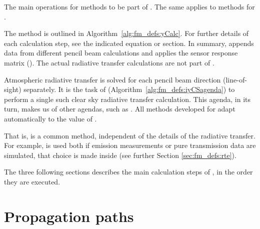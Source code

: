 \begin{algorithm}[t]
 \begin{algorithmic}
 \end{algorithmic}
 \caption{The main operations for methods to be part of
   . The same applies to methods for
   .}
 \label{alg:fm_defs:iyCSagenda}
\end{algorithm}
The  method is outlined in Algorithm~\ref{alg:fm_defs:yCalc}.
For further details of each calculation step, see the indicated equation or
section. In summary,  appends data from different pencil beam
calculations and applies the sensor response matrix (). The actual
radiative transfer calculations are not part of .

Atmospheric radiative transfer is solved for each pencil beam direction
(line-of-sight) separately. It is the task of 
(Algorithm~\ref{alg:fm_defs:iyCSagenda}) to perform a single such clear sky
radiative transfer calculation. This agenda, in its turn, makes us of other
agendas, such as . All methods developed for
 adapt automatically to the value of
.

That is,  is a common method, independent of the details of
the radiative transfer. For example,  is used both if emission
measurements or pure transmission data are simulated, that choice is made
inside  (see further Section
\ref{sec:fm_defs:rte}). 

The three following sections describes the main calculation steps of 
, in the order they are executed.


\section{Propagation paths}
\label{sec:fm_defs:ppaths}

